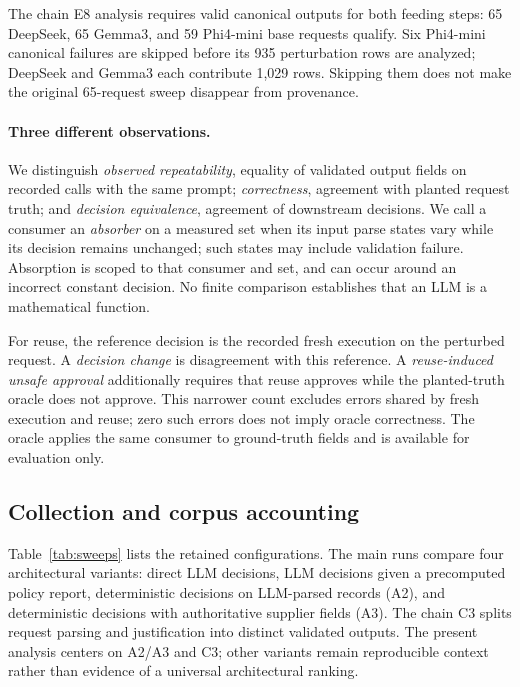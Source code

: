 The chain E8 analysis requires valid canonical outputs for both feeding steps: 65 DeepSeek, 65 Gemma3, and 59 Phi4-mini base requests qualify. Six Phi4-mini canonical failures are skipped before its 935 perturbation rows are analyzed; DeepSeek and Gemma3 each contribute 1,029 rows. Skipping them does not make the original 65-request sweep disappear from provenance.

\paragraph{Three different observations.}
We distinguish \emph{observed repeatability}, equality of validated output fields on recorded calls with the same prompt; \emph{correctness}, agreement with planted request truth; and \emph{decision equivalence}, agreement of downstream decisions. We call a consumer an \emph{absorber} on a measured set when its input parse states vary while its decision remains unchanged; such states may include validation failure. Absorption is scoped to that consumer and set, and can occur around an incorrect constant decision. No finite comparison establishes that an LLM is a mathematical function.

For reuse, the reference decision is the recorded fresh execution on the perturbed request. A \emph{decision change} is disagreement with this reference. A \emph{reuse-induced unsafe approval} additionally requires that reuse approves while the planted-truth oracle does not approve. This narrower count excludes errors shared by fresh execution and reuse; zero such errors does not imply oracle correctness. The oracle applies the same consumer to ground-truth fields and is available for evaluation only.

\iflongversion
\subsection{Collection and corpus accounting}
Table~\ref{tab:sweeps} lists the retained configurations. The main runs compare four architectural variants: direct LLM decisions, LLM decisions given a precomputed policy report, deterministic decisions on LLM-parsed records (A2), and deterministic decisions with authoritative supplier fields (A3). The chain C3 splits request parsing and justification into distinct validated outputs. The present analysis centers on A2/A3 and C3; other variants remain reproducible context rather than evidence of a universal architectural ranking.

